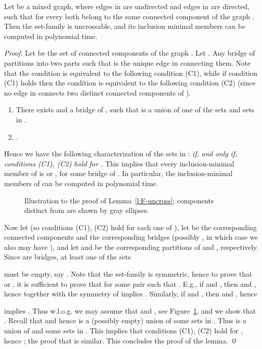 \documentclass[envcountsame]{llncs}
\begin{document}
\begin{lemma} \label{l:F-uncross}
Let  be a mixed graph, where edges in  are undirected and edges in  are directed, such that for every  both 
 belong to the same connected component of the graph . Then the set-family 
 is 
uncrossable, and its inclusion minimal members can be computed in polynomial time.
\end{lemma} 
\begin{proof}
Let  be the set of connected components of the graph .
Let .
Any bridge  of  partitions  into two parts 
such that  is the unique edge in  connecting them. 
Note that the condition  is equivalent to the following condition (C1), 
while if condition (C1) holds then the condition  
is equivalent to the following condition (C2)
(since no edge in  connects two distinct connected components of ).
\begin{enumerate}[(C1)]
\item
There exists  and a bridge  of ,
such that  is a union of one of the sets 
and sets in .
\item
.
\end{enumerate}
Hence we have the following characterization of the sets in :
{\em  if, and only if, conditions (C1), (C2) hold for .} 
This implies that every inclusion-minimal member of  is 
 or , for some bridge  of .
In particular, the inclusion-minimal members of  
can be computed in polynomial time.



\begin{figure} 
\centering 
{}
   \caption{Illustration to the proof of Lemma~\ref{l:F-uncross};
            components distinct from  are shown by gray ellipses.} 
\label{f:comps}
\end{figure}


Now let  (so conditions (C1), (C2) hold for each one of ), 
let  be the corresponding connected components and 
 the corresponding bridges 
(possibly , in which case we also may have ), and let 
 and  be the corresponding partitions of  and , respectively.
Since  are bridges, at least one of the sets 

must be empty, say .
Note that the set-family  is symmetric, hence to prove that 
 or ,
it is sufficient to prove 
that  
for some pair  such that .
E.g., if  and , then 
 and , hence 
 together with the 
symmetry of  implies .
Similarly, if  and , then 
 and 
, hence 
  
implies .
Thus w.l.o.g. we may assume that 
 and , see Figure~\ref{f:comps},
and we show that .
Recall that  and
hence  is a (possibly empty) union of some sets in 
.
Thus  is a union of  and some sets in 
.
This implies that conditions (C1), (C2) hold for , hence 
; the proof that
 is similar.
This concludes the proof of the lemma.
\qed
\end{proof}
\end{document}
